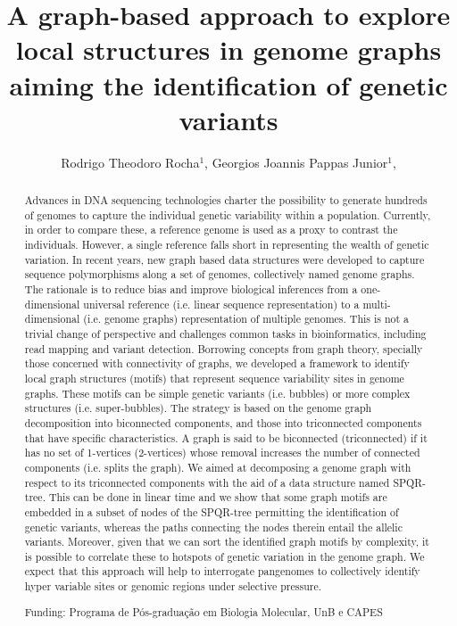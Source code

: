 \documentclass[twoside]{article}
\title{\vspace{-15mm}\fontsize{24pt}{10pt}\selectfont\textbf{ A graph-based approach to explore local structures in genome graphs aiming the identification of genetic variants }} %
\author{ Rodrigo Theodoro Rocha$^{1}$, Georgios Joannis Pappas Junior$^{1}$, }
\affil{ 1 Departamento de Biologia Celular, Instituto de Ciências Biológicas, Universidade de Brasília

 }
\date{}
\begin{document}
  
  
  \maketitle %
  
  
  \thispagestyle{fancy} %
  
  
  \begin{abstract}
  Advances in DNA sequencing technologies charter the possibility to generate hundreds of genomes to capture the individual genetic variability within a population. Currently, in order to compare these, a reference genome is used as a proxy to contrast the individuals. However, a single reference falls short in representing the wealth of genetic variation. In recent years, new graph based data structures were developed to capture sequence polymorphisms along a set of genomes, collectively named genome graphs. The rationale is to reduce bias and improve biological inferences from a one-dimensional universal reference (i.e. linear sequence representation) to a multi-dimensional (i.e. genome graphs) representation of multiple genomes. This is not a trivial change of perspective and challenges common tasks in bioinformatics, including read mapping and variant detection.  Borrowing concepts from graph theory, specially those concerned with connectivity of graphs, we developed a framework to identify local graph structures (motifs) that represent sequence variability sites in genome graphs. These motifs can be simple genetic variants (i.e. bubbles) or more complex structures (i.e. super-bubbles). The strategy is based on the genome graph decomposition into biconnected components, and those into triconnected components that have specific characteristics. A graph is said to be biconnected (triconnected) if it has no set of 1-vertices (2-vertices) whose removal increases the number of connected components (i.e. splits the graph). 
We aimed at decomposing a genome graph with respect to its triconnected components with the aid of a data structure named SPQR-tree. This can be done in linear time and we show that some graph motifs are embedded in a subset of nodes of the SPQR-tree permitting the identification of genetic variants, whereas the paths connecting the nodes therein entail the allelic variants. Moreover, given that we can sort the identified graph motifs by complexity, it is possible to correlate these to hotspots of genetic variation in the genome graph. We expect that this approach will help to interrogate pangenomes to collectively identify hyper variable sites or genomic regions under selective pressure.
  
  Funding: Programa de P\'os-gradua\c{c}\~ao em Biologia Molecular, UnB e CAPES \\ 
  \end{abstract}
  
\end{document}
